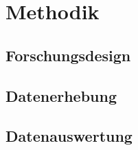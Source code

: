 \section{Methodik}

\subsection{Forschungsdesign}

\subsection{Datenerhebung}

\subsection{Datenauswertung}

